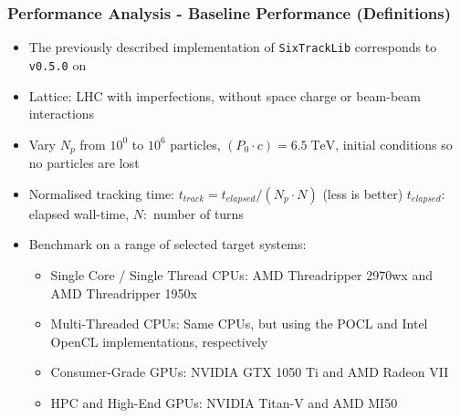 \documentclass{beamer}
\begin{document}
\begin{frame}
    \frametitle{Performance Analysis - Baseline Performance (Definitions)}
    \begin{itemize}
        \item The previously described implementation of \texttt{SixTrackLib} corresponds to \texttt{v0.5.0} on\cite{sixtracklib-repo-2021}
        \item {\color{MyDarkBlue}Lattice:} LHC with imperfections, without space charge or beam-beam interactions
        \item Vary $N_p$ from $10^0$ to $10^6$ particles, $(P_0 \cdot c) = 6.5\;\text{TeV}$, initial conditions so no particles are lost
        \item {\color{MyDarkBlue}Normalised tracking time:} $t_{track} = t_{elapsed} / \left( N_p \cdot N \right)$ (less is better)\newline
              $t_{elapsed}:$ elapsed wall-time, $N:$ number of turns
        \item Benchmark on a range of selected target systems\cite{data-repo-2021}:
        \begin{itemize}
            \item {\color{MyDarkRed}Single Core / Single Thread CPUs:} AMD Threadripper 2970wx and AMD Threadripper 1950x
            \item {\color{MyDarkRed}Multi-Threaded CPUs:} Same CPUs, but using the POCL and Intel OpenCL implementations, respectively
            \item {\color{MyDarkRed}Consumer-Grade GPUs:} NVIDIA GTX 1050 Ti and AMD Radeon VII
            \item {\color{MyDarkRed}HPC and High-End GPUs:} NVIDIA Titan-V and AMD MI50
        \end{itemize}
    \end{itemize}
\end{frame}
\end{document}
